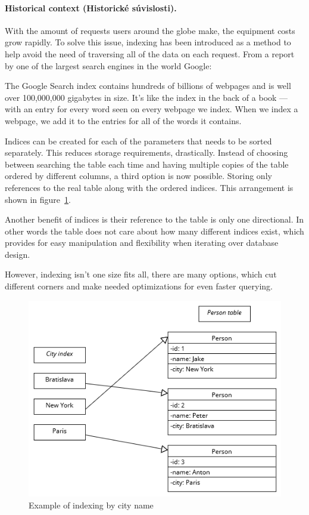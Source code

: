 \documentclass[10pt,twoside,a4paper]{article}
\begin{document}
\paragraph{Historical context (Historické súvislosti).}With the amount of requests users around the globe make, the equipment costs grow rapidly. To solve this issue, indexing has been introduced as a method to help avoid the need of traversing all of the data on each request. From a report by one of the largest search engines in the world Google\cite{Google}:
\begin{displayquote}
The Google Search index contains hundreds of billions of webpages and is well over 100,000,000 gigabytes in size. It’s like the index in the back of a book — with an entry for every word seen on every webpage we index. When we index a webpage, we add it to the entries for all of the words it contains.
\end{displayquote}

Indices can be created for each of the parameters that needs to be sorted separately. This reduces storage requirements, drastically. Instead of choosing between searching the table each time and having multiple copies of the table ordered by different columns, a third option is now possible. Storing only references to the real table along with the ordered indices. This arrangement is shown in figure~\ref{fig:index-city}.

Another benefit of indices is their reference to the table is only one directional. In other words the table does not care about how many different indices exist, which provides for easy manipulation and flexibility when iterating over database design.

However, indexing isn't one size fits all\cite{10.1007/978-3-319-93803-5_1}, there are many options, which cut different corners and make needed optimizations for even faster querying.

\begin{figure}
    \centering
    \includegraphics[width=1\linewidth]{Indexing.png}
    \caption{Example of indexing by city name}
    \label{fig:index-city}
\end{figure}
\end{document}
